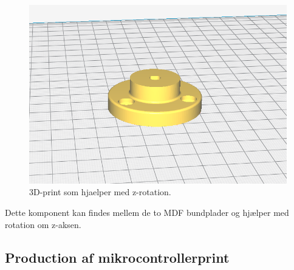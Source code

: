 \begin{figure}[H]
\centering
\includegraphics[scale=0.4]{Billeder/3D_print_2.PNG}
\caption{3D-print som hjaelper med z-rotation.}
\label{fig:3D_print_2}
\end{figure}

Dette komponent kan findes mellem de to MDF bundplader og hjælper med rotation om z-aksen.  \\

\subsection{Production af mikrocontrollerprint}

